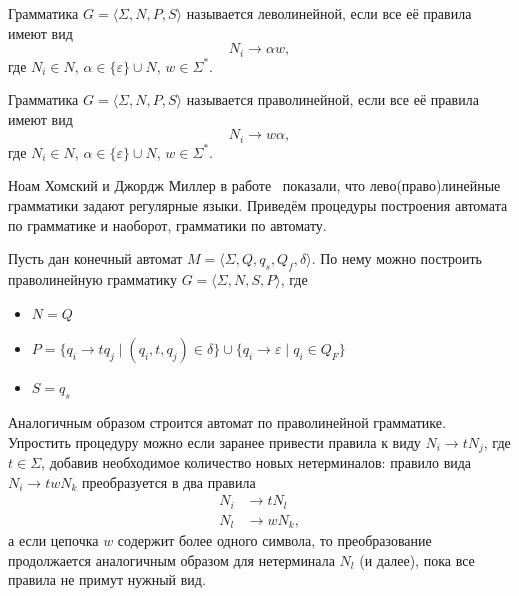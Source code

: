 \begin{definition}
    Грамматика $G=\langle \Sigma, N, P, S \rangle$ называется леволинейной, если все её правила имеют вид
    \[N_i \to \alpha w,\]
    где $N_i \in N$, $\alpha \in \{\varepsilon\} \cup N$, $w \in \Sigma ^*$.
\end{definition}

\begin{definition}
    Грамматика $G=\langle \Sigma, N, P, S \rangle$ называется праволинейной, если все её правила имеют вид
    \[N_i \to  w \alpha,\]
    где $N_i \in N$, $\alpha \in \{\varepsilon\} \cup N$, $w \in \Sigma ^*$.
\end{definition}

Ноам Хомский и Джордж Миллер в работе~ показали, что лево(право)линейные грамматики задают регулярные языки.
Приведём процедуры построения автомата по грамматике и наоборот, грамматики по автомату.

Пусть дан конечный автомат $M = \langle \Sigma, Q, q_s, Q_f, \delta \rangle$. По нему можно построить праволинейную грамматику $G=\langle \Sigma, N, S, P \rangle$, где
\begin{itemize}
    \item $N = Q$
    \item $P = \{ q_i \to t q_j \mid (q_i, t, q_j)\in \delta\} \cup \{ q_i \to \varepsilon \mid q_i \in Q_F\}$
    \item $S = q_s$
\end{itemize}

Аналогичным образом строится автомат по праволинейной грамматике.
Упростить процедуру можно если заранее привести правила к виду $N_i \to tN_j$, где $t\in \Sigma$, добавив необходимое количество новых нетерминалов:
правило вида $N_i \to twN_k$ преобразуется в два правила
\begin{align*}
    N_i & \to tN_l  \\
    N_l & \to wN_k,
\end{align*}
а если цепочка $w$ содержит более одного символа, то преобразование продолжается аналогичным образом для нетерминала $N_l$ (и далее), пока все правила не примут нужный вид.

